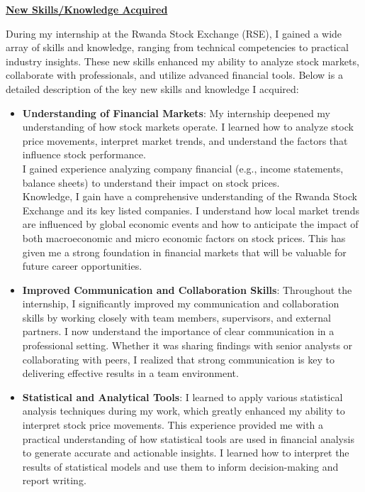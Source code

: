 \documentclass{article}
\begin{document}
\begin{titlepage}
\begin{titlepage}
\begin{flushleft}
\begin{flushleft}
\textbf{\underline{New Skills/Knowledge Acquired}}
\\
\vspace{0.2cm}

During my internship at the Rwanda Stock Exchange (RSE), I gained a wide array of skills and knowledge, ranging from technical competencies to practical industry insights. These new skills enhanced my ability to analyze stock markets, collaborate with professionals, and utilize advanced financial tools. Below is a detailed description of the key new skills and knowledge I acquired:

\begin{itemize}
    \item \textbf{ Understanding of Financial Markets}:
    My internship deepened my understanding of how stock markets operate. I learned how to analyze stock price movements, interpret market trends, and understand the factors that influence stock performance.\\
    
    I gained experience analyzing company financial (e.g., income statements, balance sheets) to understand their impact on stock prices.\\
    Knowledge, I gain  have a comprehensive understanding of the Rwanda Stock Exchange and its key listed companies. I understand how local market trends are influenced by global economic events and how to anticipate the impact of both macroeconomic and micro economic factors on stock prices. This has given me a strong foundation in financial markets that will be valuable for future career opportunities.
    \item \textbf{Improved Communication and Collaboration Skills}:
    Throughout the internship, I significantly improved my communication and collaboration skills by working closely with team members, supervisors, and external partners.
    I now understand the importance of clear communication in a professional setting. Whether it was sharing findings with senior analysts or collaborating with peers, I realized that strong communication is key to delivering effective results in a team environment.
    \item \textbf{Statistical and Analytical Tools}:
    I learned to apply various statistical analysis techniques during my work, which greatly enhanced my ability to interpret stock price movements.
    This experience provided me with a practical understanding of how statistical tools are used in financial analysis to generate accurate and actionable insights. I learned how to interpret the results of statistical models and use them to inform decision-making and report writing.
    \vspace{1cm}


\end{itemize}
\end{flushleft}
\end{flushleft}
\end{titlepage}
\end{titlepage}
\end{document}
